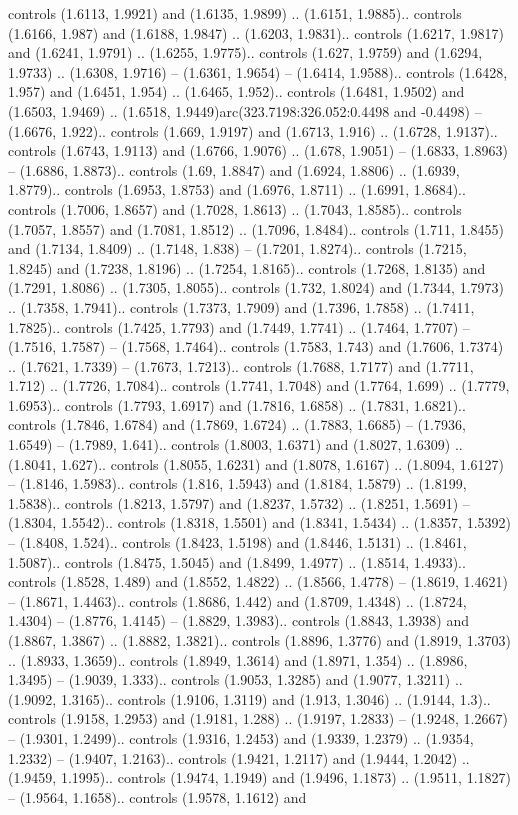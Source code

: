 controls (1.6113, 1.9921) and (1.6135, 1.9899) .. (1.6151, 1.9885).. controls (1.6166, 1.987) and (1.6188, 1.9847) .. (1.6203, 1.9831).. controls (1.6217, 1.9817) and (1.6241, 1.9791) .. (1.6255, 1.9775).. controls (1.627, 1.9759) and (1.6294, 1.9733) .. (1.6308, 1.9716) -- (1.6361, 1.9654) -- (1.6414, 1.9588).. controls (1.6428, 1.957) and (1.6451, 1.954) .. (1.6465, 1.952).. controls (1.6481, 1.9502) and (1.6503, 1.9469) .. (1.6518, 1.9449)arc(323.7198:326.052:0.4498 and -0.4498) -- (1.6676, 1.922).. controls (1.669, 1.9197) and (1.6713, 1.916) .. (1.6728, 1.9137).. controls (1.6743, 1.9113) and (1.6766, 1.9076) .. (1.678, 1.9051) -- (1.6833, 1.8963) -- (1.6886, 1.8873).. controls (1.69, 1.8847) and (1.6924, 1.8806) .. (1.6939, 1.8779).. controls (1.6953, 1.8753) and (1.6976, 1.8711) .. (1.6991, 1.8684).. controls (1.7006, 1.8657) and (1.7028, 1.8613) .. (1.7043, 1.8585).. controls (1.7057, 1.8557) and (1.7081, 1.8512) .. (1.7096, 1.8484).. controls (1.711, 1.8455) and (1.7134, 1.8409) .. (1.7148, 1.838) -- (1.7201, 1.8274).. controls (1.7215, 1.8245) and (1.7238, 1.8196) .. (1.7254, 1.8165).. controls (1.7268, 1.8135) and (1.7291, 1.8086) .. (1.7305, 1.8055).. controls (1.732, 1.8024) and (1.7344, 1.7973) .. (1.7358, 1.7941).. controls (1.7373, 1.7909) and (1.7396, 1.7858) .. (1.7411, 1.7825).. controls (1.7425, 1.7793) and (1.7449, 1.7741) .. (1.7464, 1.7707) -- (1.7516, 1.7587) -- (1.7568, 1.7464).. controls (1.7583, 1.743) and (1.7606, 1.7374) .. (1.7621, 1.7339) -- (1.7673, 1.7213).. controls (1.7688, 1.7177) and (1.7711, 1.712) .. (1.7726, 1.7084).. controls (1.7741, 1.7048) and (1.7764, 1.699) .. (1.7779, 1.6953).. controls (1.7793, 1.6917) and (1.7816, 1.6858) .. (1.7831, 1.6821).. controls (1.7846, 1.6784) and (1.7869, 1.6724) .. (1.7883, 1.6685) -- (1.7936, 1.6549) -- (1.7989, 1.641).. controls (1.8003, 1.6371) and (1.8027, 1.6309) .. (1.8041, 1.627).. controls (1.8055, 1.6231) and (1.8078, 1.6167) .. (1.8094, 1.6127) -- (1.8146, 1.5983).. controls (1.816, 1.5943) and (1.8184, 1.5879) .. (1.8199, 1.5838).. controls (1.8213, 1.5797) and (1.8237, 1.5732) .. (1.8251, 1.5691) -- (1.8304, 1.5542).. controls (1.8318, 1.5501) and (1.8341, 1.5434) .. (1.8357, 1.5392) -- (1.8408, 1.524).. controls (1.8423, 1.5198) and (1.8446, 1.5131) .. (1.8461, 1.5087).. controls (1.8475, 1.5045) and (1.8499, 1.4977) .. (1.8514, 1.4933).. controls (1.8528, 1.489) and (1.8552, 1.4822) .. (1.8566, 1.4778) -- (1.8619, 1.4621) -- (1.8671, 1.4463).. controls (1.8686, 1.442) and (1.8709, 1.4348) .. (1.8724, 1.4304) -- (1.8776, 1.4145) -- (1.8829, 1.3983).. controls (1.8843, 1.3938) and (1.8867, 1.3867) .. (1.8882, 1.3821).. controls (1.8896, 1.3776) and (1.8919, 1.3703) .. (1.8933, 1.3659).. controls (1.8949, 1.3614) and (1.8971, 1.354) .. (1.8986, 1.3495) -- (1.9039, 1.333).. controls (1.9053, 1.3285) and (1.9077, 1.3211) .. (1.9092, 1.3165).. controls (1.9106, 1.3119) and (1.913, 1.3046) .. (1.9144, 1.3).. controls (1.9158, 1.2953) and (1.9181, 1.288) .. (1.9197, 1.2833) -- (1.9248, 1.2667) -- (1.9301, 1.2499).. controls (1.9316, 1.2453) and (1.9339, 1.2379) .. (1.9354, 1.2332) -- (1.9407, 1.2163).. controls (1.9421, 1.2117) and (1.9444, 1.2042) .. (1.9459, 1.1995).. controls (1.9474, 1.1949) and (1.9496, 1.1873) .. (1.9511, 1.1827) -- (1.9564, 1.1658).. controls (1.9578, 1.1612) and 